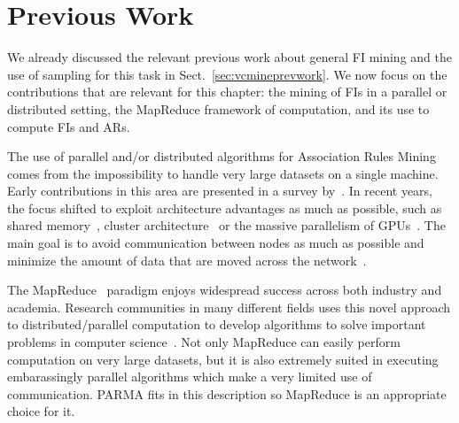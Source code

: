 \section{Previous Work}
\label{sec:parmarelated}
We already discussed the relevant previous work about general FI mining and the
use of sampling for this task in Sect.~\ref{sec:vcmineprevwork}. We now focus on the
contributions that are relevant for this chapter: the mining of FIs in a
parallel or distributed setting, the MapReduce framework of computation, and its
use to compute FIs and ARs.

The use of parallel and/or distributed algorithms for Association Rules Mining comes from the
impossibility to handle very large datasets on a single machine. Early
contributions in this area are presented in a survey by~\citet{Zaki99}.
In recent years, the focus shifted to exploit architecture advantages as much as
possible, such as shared memory~\citep{JinYA05}, cluster
architecture~\citep{BuehrerPTKS07} or the massive parallelism of
GPUs~\citep{FangEtAl08}. The main goal is to avoid communication
between nodes as much as possible and minimize the amount of data that are moved
across the 
network~\citep{CongHHP05,EHZaiane06,LiuLZT07,OzkuralUA11}.

The MapReduce~\citep{DeanG08} paradigm enjoys widespread success
across both industry and academia. Research communities in many different
fields uses this novel approach to distributed/parallel computation to develop
algorithms to solve important problems in computer
science~\citep{ChierichettiKT10,ChuKLYBNO06,GoodrichSZ11,LinS10,PietracaprinaPRSU12}.
Not only MapReduce can easily perform computation on very large datasets, but it
is also extremely suited in executing embarassingly parallel algorithms which
make a very limited use of communication. PARMA fits in this description so
MapReduce is an appropriate choice for it.

